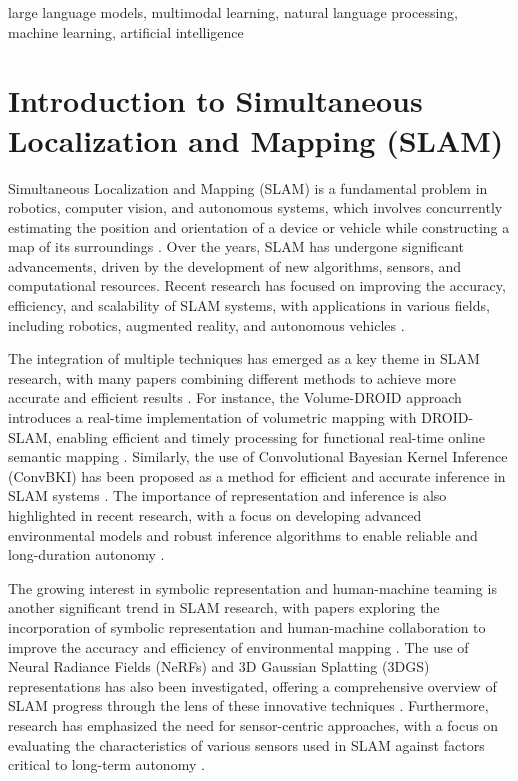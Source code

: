 \documentclass[conference]{IEEEtran}
\begin{document}
\begin{IEEEkeywords}
large language models, multimodal learning, natural language processing, machine learning, artificial intelligence
\end{IEEEkeywords}


\section{Introduction to Simultaneous Localization and Mapping (SLAM)}
Simultaneous Localization and Mapping (SLAM) is a fundamental problem in robotics, computer vision, and autonomous systems, which involves concurrently estimating the position and orientation of a device or vehicle while constructing a map of its surroundings \cite{b1}. Over the years, SLAM has undergone significant advancements, driven by the development of new algorithms, sensors, and computational resources. Recent research has focused on improving the accuracy, efficiency, and scalability of SLAM systems, with applications in various fields, including robotics, augmented reality, and autonomous vehicles \cite{b2}.

The integration of multiple techniques has emerged as a key theme in SLAM research, with many papers combining different methods to achieve more accurate and efficient results \cite{b3}. For instance, the Volume-DROID approach introduces a real-time implementation of volumetric mapping with DROID-SLAM, enabling efficient and timely processing for functional real-time online semantic mapping \cite{b4}. Similarly, the use of Convolutional Bayesian Kernel Inference (ConvBKI) has been proposed as a method for efficient and accurate inference in SLAM systems \cite{b5}. The importance of representation and inference is also highlighted in recent research, with a focus on developing advanced environmental models and robust inference algorithms to enable reliable and long-duration autonomy \cite{b6}.

The growing interest in symbolic representation and human-machine teaming is another significant trend in SLAM research, with papers exploring the incorporation of symbolic representation and human-machine collaboration to improve the accuracy and efficiency of environmental mapping \cite{b7}. The use of Neural Radiance Fields (NeRFs) and 3D Gaussian Splatting (3DGS) representations has also been investigated, offering a comprehensive overview of SLAM progress through the lens of these innovative techniques \cite{b8}. Furthermore, research has emphasized the need for sensor-centric approaches, with a focus on evaluating the characteristics of various sensors used in SLAM against factors critical to long-term autonomy \cite{b9}.
\end{document}
